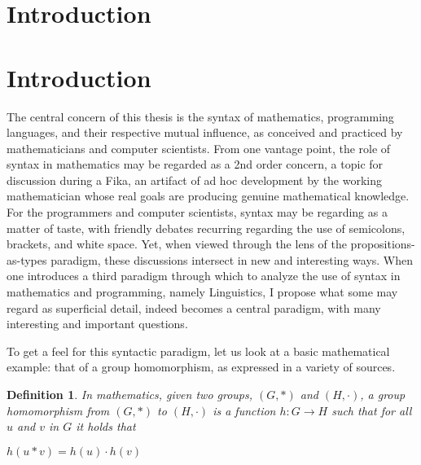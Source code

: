 \documentclass[11pt, a4paper]{article}
\newtheorem{definition}{Definition}
\begin{document}
\begin{spacing}{0.0}
\tableofcontents
\end{spacing}

\thispagestyle{empty}

\newpage
\setcounter{page}{1}

\section{Introduction}
\label{sec:intro}

\section{Introduction}

The central concern of this thesis is the syntax of mathematics, programming
languages, and their respective mutual influence, as conceived and practiced by
mathematicians and computer scientists.  From one vantage point, the role of
syntax in mathematics may be regarded as a 2nd order concern, a topic for
discussion during a Fika, an artifact of ad hoc development by the working
mathematician whose real goals are producing genuine mathematical knowledge.
For the programmers and computer scientists, syntax may be regarding as a
matter of taste, with friendly debates recurring regarding the use of
semicolons, brackets, and white space.  Yet, when viewed through the lens of
the propositions-as-types paradigm, these discussions intersect in new and
interesting ways.  When one introduces a third paradigm through which to
analyze the use of syntax in mathematics and programming, namely Linguistics, I
propose what some may regard as superficial detail, indeed becomes a central
paradigm, with many interesting and important questions. 

To get a feel for this syntactic paradigm, let us look at a basic mathematical
example: that of a group homomorphism, as expressed in a variety of sources.  


\begin{definition}
In mathematics, given two groups, $(G, \ast)$ and $(H, \cdot)$, a group homomorphism from $(G, \ast)$ to $(H, \cdot)$ is a function $h : G \to H$ such that for all $u$ and $v$ in $G$ it holds that

\begin{center}
  $h(u \ast v) = h ( u ) \cdot h ( v )$ 
\end{center}
\end{definition}
\end{document}
